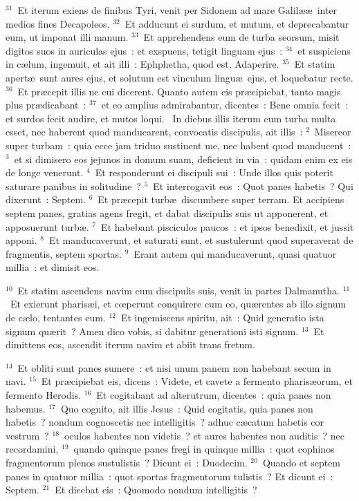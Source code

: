 ${}^{31}$~Et iterum exiens de finibus Tyri, venit per Sidonem ad mare Galil\ae \ae\ inter medios fines Decapoleos.
${}^{32}$~Et adducunt ei surdum, et mutum, et deprecabantur eum, ut imponat illi manum.
${}^{33}$~Et apprehendens eum de turba seorsum, misit digitos suos in auriculas ejus~: et exspuens, tetigit linguam ejus~:
${}^{34}$~et suspiciens in c\ae lum, ingemuit, et ait illi~: Ephphetha, quod est, Adaperire.
${}^{35}$~Et statim apert\ae\ sunt aures ejus, et solutum est vinculum lingu\ae\ ejus, et loquebatur recte.
${}^{36}$~Et pr\ae cepit illis ne cui dicerent. Quanto autem eis pr\ae cipiebat, tanto magis plus pr\ae dicabant~:
${}^{37}$~et eo amplius admirabantur, dicentes~: Bene omnia fecit~: et surdos fecit audire, et mutos loqui.
~\lettrine[lines=10,image=true,loversize=0.05,lraise=-0.03]{I}{}n diebus illis iterum cum turba multa esset, nec haberent quod manducarent, convocatis discipulis, ait illis~:
${}^{2}$~Misereor super turbam~: quia ecce jam triduo sustinent me, nec habent quod manducent~:
${}^{3}$~et si dimisero eos jejunos in domum suam, deficient in via~: quidam enim ex eis de longe venerunt.
${}^{4}$~Et responderunt ei discipuli sui~: Unde illos quis poterit saturare panibus in solitudine~?
${}^{5}$~Et interrogavit eos~: Quot panes habetis~? Qui dixerunt~: Septem.
${}^{6}$~Et pr\ae cepit turb\ae\ discumbere super terram. Et accipiens septem panes, gratias agens fregit, et dabat discipulis suis ut apponerent, et apposuerunt turb\ae .
${}^{7}$~Et habebant pisciculos paucos~: et ipsos benedixit, et jussit apponi.
${}^{8}$~Et manducaverunt, et saturati sunt, et sustulerunt quod superaverat de fragmentis, septem sportas.
${}^{9}$~Erant autem qui manducaverunt, quasi quatuor millia~: et dimisit eos.


${}^{10}$~Et statim ascendens navim cum discipulis suis, venit in partes Dalmanutha.
${}^{11}$~Et exierunt pharis\ae i, et cœperunt conquirere cum eo, qu\ae rentes ab illo signum de c\ae lo, tentantes eum.
${}^{12}$~Et ingemiscens spiritu, ait~: Quid generatio ista signum qu\ae rit~? Amen dico vobis, si dabitur generationi isti signum.
${}^{13}$~Et dimittens eos, ascendit iterum navim et abiit trans fretum.


${}^{14}$~Et obliti sunt panes sumere~: et nisi unum panem non habebant secum in navi.
${}^{15}$~Et pr\ae cipiebat eis, dicens~: Videte, et cavete a fermento pharis\ae orum, et fermento Herodis.
${}^{16}$~Et cogitabant ad alterutrum, dicentes~: quia panes non habemus.
${}^{17}$~Quo cognito, ait illis Jesus~: Quid cogitatis, quia panes non habetis~? nondum cognoscetis nec intelligitis~? adhuc c\ae catum habetis cor vestrum~?
${}^{18}$~oculos habentes non videtis~? et aures habentes non auditis~? nec recordamini,
${}^{19}$~quando quinque panes fregi in quinque millia~: quot cophinos fragmentorum plenos sustulistis~? Dicunt ei~: Duodecim.
${}^{20}$~Quando et septem panes in quatuor millia~: quot sportas fragmentorum tulistis~? Et dicunt ei~: Septem.
${}^{21}$~Et dicebat eis~: Quomodo nondum intelligitis~?


